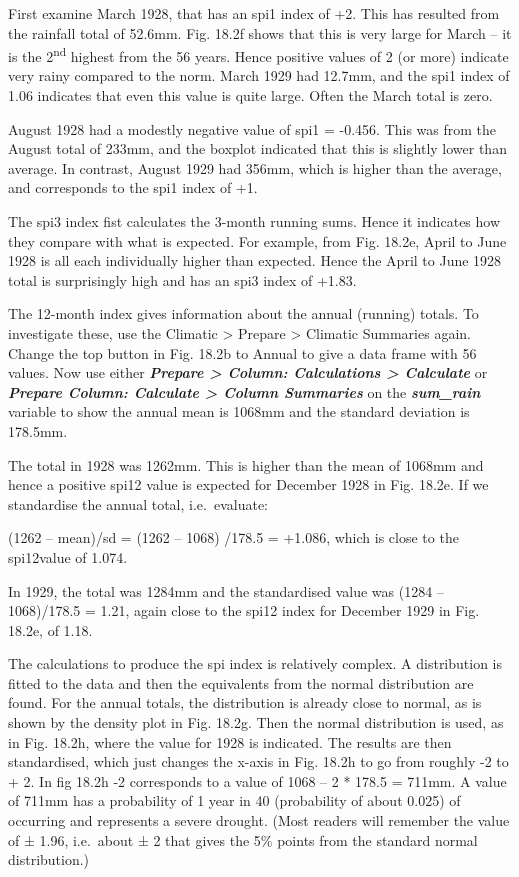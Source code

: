 \documentclass[
  letterpaper,
  DIV=11,
  numbers=noendperiod]{scrreprt}
\begin{document}
First examine March 1928, that has an spi1 index of +2. This has
resulted from the rainfall total of 52.6mm. Fig. 18.2f shows that this
is very large for March -- it is the 2\textsuperscript{nd} highest from
the 56 years. Hence positive values of 2 (or more) indicate very rainy
compared to the norm. March 1929 had 12.7mm, and the spi1 index of 1.06
indicates that even this value is quite large. Often the March total is
zero.

August 1928 had a modestly negative value of spi1 = -0.456. This was
from the August total of 233mm, and the boxplot indicated that this is
slightly lower than average. In contrast, August 1929 had 356mm, which
is higher than the average, and corresponds to the spi1 index of +1.

The spi3 index fist calculates the 3-month running sums. Hence it
indicates how they compare with what is expected. For example, from Fig.
18.2e, April to June 1928 is all each individually higher than expected.
Hence the April to June 1928 total is surprisingly high and has an spi3
index of +1.83.

The 12-month index gives information about the annual (running) totals.
To investigate these, use the Climatic \textgreater{} Prepare
\textgreater{} Climatic Summaries again. Change the top button in Fig.
18.2b to Annual to give a data frame with 56 values. Now use either
\textbf{\emph{Prepare \textgreater{} Column: Calculations \textgreater{}
Calculate}} or \textbf{\emph{Prepare Column: Calculate \textgreater{}
Column Summaries}} on the \textbf{\emph{sum\_rain}} variable to show the
annual mean is 1068mm and the standard deviation is 178.5mm.

The total in 1928 was 1262mm. This is higher than the mean of 1068mm and
hence a positive spi12 value is expected for December 1928 in Fig.
18.2e. If we standardise the annual total, i.e.~evaluate:

(1262 -- mean)/sd = (1262 -- 1068) /178.5 = +1.086, which is close to
the spi12value of 1.074.

In 1929, the total was 1284mm and the standardised value was (1284 --
1068)/178.5 = 1.21, again close to the spi12 index for December 1929 in
Fig. 18.2e, of 1.18.

The calculations to produce the spi index is relatively complex. A
distribution is fitted to the data and then the equivalents from the
normal distribution are found. For the annual totals, the distribution
is already close to normal, as is shown by the density plot in Fig.
18.2g. Then the normal distribution is used, as in Fig. 18.2h, where the
value for 1928 is indicated. The results are then standardised, which
just changes the x-axis in Fig. 18.2h to go from roughly -2 to + 2. In
fig 18.2h -2 corresponds to a value of 1068 -- 2 * 178.5 = 711mm. A
value of 711mm has a probability of 1 year in 40 (probability of about
0.025) of occurring and represents a severe drought. (Most readers will
remember the value of ± 1.96, i.e.~about ± 2 that gives the 5\% points
from the standard normal distribution.)
\end{document}
